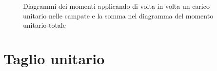 \begin{figure}[p]
\caption{Diagrammi dei momenti applicando di volta in volta un carico unitario nelle campate e la somma nel diagramma del momento unitario totale}
\label{fig:MomentiUnitari}
\end{figure}
\section{Taglio unitario}
